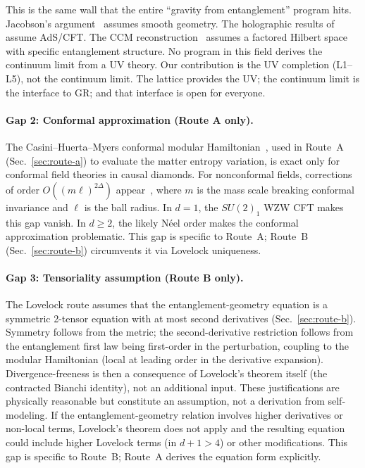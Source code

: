 This is the same wall that the entire ``gravity from entanglement''
program hits.  Jacobson's argument~\cite{Jacobson2016} assumes smooth
geometry.  The holographic results
of~\cite{LMVR2014, Faulkner2014} assume AdS/CFT.  The CCM
reconstruction~\cite{CCM2017} assumes a factored Hilbert space with
specific entanglement structure.  No program in this field derives the
continuum limit from a UV theory.  Our contribution is the UV
completion (L1--L5), not the continuum limit.  The lattice provides the
UV; the continuum limit is the interface to GR; and that interface is
open for everyone.

\paragraph{Gap 2: Conformal approximation (Route A only).}
The Casini--Huerta--Myers conformal modular
Hamiltonian~\cite{CasiniHuertaMyers2011}, used in Route~A
(Sec.~\ref{sec:route-a}) to evaluate the matter entropy variation, is
exact only for conformal field theories in causal diamonds.  For
nonconformal fields, corrections of order
$O\!\left((m\ell)^{2\Delta}\right)$ appear~\cite{Speranza2016}, where
$m$ is the mass scale breaking conformal invariance and $\ell$ is the
ball radius.  In $d = 1$, the $SU(2)_1$ WZW CFT makes this gap vanish.
In $d \geq 2$, the likely N\'eel order makes the conformal approximation
problematic.  This gap is specific to Route~A; Route~B
(Sec.~\ref{sec:route-b}) circumvents it via Lovelock uniqueness.

\paragraph{Gap 3: Tensoriality assumption (Route B only).}
The Lovelock route assumes that the entanglement-geometry equation is a
symmetric 2-tensor equation with at most second derivatives
(Sec.~\ref{sec:route-b}).  Symmetry follows from the metric; the
second-derivative restriction follows from the entanglement first law
being first-order in the perturbation, coupling to the modular
Hamiltonian (local at leading order in the derivative expansion).
Divergence-freeness is then a consequence of Lovelock's theorem
itself (the contracted Bianchi identity), not an additional input.
These justifications are physically reasonable but constitute an
assumption, not a derivation from self-modeling.  If the
entanglement-geometry relation involves higher derivatives or non-local
terms, Lovelock's theorem does not apply and the resulting equation
could include higher Lovelock terms (in $d + 1 > 4$) or other
modifications.  This gap is specific to Route~B; Route~A derives the
equation form explicitly.

